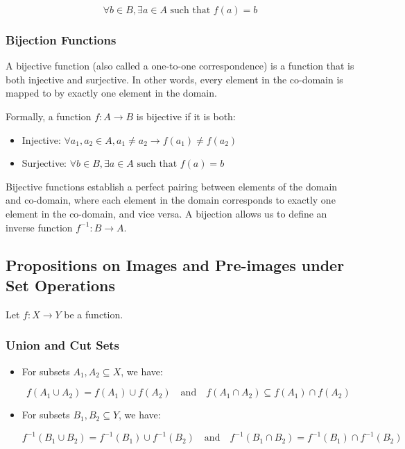 \[
	\forall b \in B, \exists a \in A \text{ such that } f(a) = b
\]

\subsubsection{Bijection Functions}

A bijective function (also called a one-to-one correspondence) is a 
function that is both injective and surjective. In other words, every 
element in the co-domain is mapped to by exactly one element in the domain.

Formally, a function \(f: A \to B\) is bijective if it is both:

\begin{itemize}

	\item Injective: \(\forall a_1, a_2 \in A, a_1 \neq a_2 \to f(a_1) \neq f(a_2)\)

	\item Surjective: \(\forall b \in B, \exists a \in A \text{ such that } f(a) = b\)

\end{itemize}

Bijective functions establish a perfect pairing between elements of the domain and co-domain, where each 
element in the domain corresponds to exactly one element in the co-domain, and vice versa. A bijection 
allows us to define an inverse function \(f^{-1}: B \to A\).

\subsection{Propositions on Images and Pre-images under Set Operations}

Let \( f : X \to Y \) be a function.

\subsubsection{Union and Cut Sets}

\begin{itemize}

	\item For subsets \( A_1, A_2 \subseteq X \), we have:

	      \[
		      f(A_1 \cup A_2) = f(A_1) \cup f(A_2)
		      \quad \text{and} \quad
		      f(A_1 \cap A_2) \subseteq f(A_1) \cap f(A_2)
	      \]

	\item For subsets \( B_1, B_2 \subseteq Y \), we have:
	      
	      \[
		      f^{-1}(B_1 \cup B_2) = f^{-1}(B_1) \cup f^{-1}(B_2)
		      \quad \text{and} \quad
		      f^{-1}(B_1 \cap B_2) = f^{-1}(B_1) \cap f^{-1}(B_2)
	      \]
\end{itemize}

